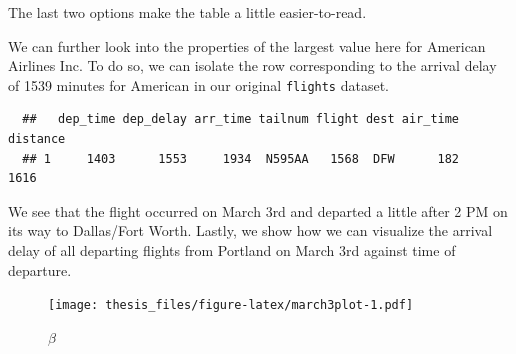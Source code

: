 \documentclass[12pt,twoside]{reedthesis}
\theoremstyle{definition}
\theoremstyle{definition}
\theoremstyle{remark}
\begin{document}
  The last two options make the table a little easier-to-read.
  
  We can further look into the properties of the largest value here for
  American Airlines Inc. To do so, we can isolate the row corresponding to
  the arrival delay of 1539 minutes for American in our original
  \texttt{flights} dataset.
  
  \begin{Shaded}
  \end{Shaded}
  
  \begin{verbatim}
  ##   dep_time dep_delay arr_time tailnum flight dest air_time distance
  ## 1     1403      1553     1934  N595AA   1568  DFW      182     1616
  \end{verbatim}
  
  We see that the flight occurred on March 3rd and departed a little after
  2 PM on its way to Dallas/Fort Worth. Lastly, we show how we can
  visualize the arrival delay of all departing flights from Portland on
  March 3rd against time of departure.
  
  \begin{Shaded}
  \end{Shaded}
  
  \begin{figure}[htbp]
  \centering
  \texttt{[image: thesis\_files/figure-latex/march3plot-1.pdf]}
  \caption{\label{fig:march3plot}\(\beta\)}
  \end{figure}
  
\end{document}
